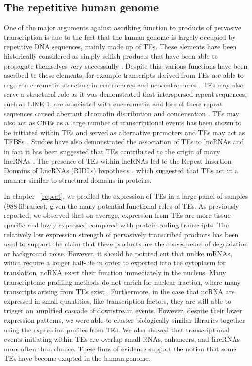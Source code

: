 \subsection{The repetitive human genome}

One of the major arguments against ascribing function to products of pervasive transcription is due to the fact that the human genome is largely occupied by repetitive DNA sequences, mainly made up of TEs. These elements have been historically considered as simply selfish products that have been able to propagate themselves very successfully \citep{doolittle1980selfish,orgel1980selfish}. Despite this, various functions have been ascribed to these elements; for example transcripts derived from TEs are able to regulate chromatin structure in centromeres and neocentromeres \citep{pmid19180186}. TEs may also serve a structural role as it was demonstrated that interspersed repeat sequences, such as LINE-1, are associated with euchromatin and loss of these repeat sequences caused aberrant chromatin distribution and condensation \citep{pmid24581492}. TEs may also act as CREs as a large number of transcriptional events has been shown to be initiated within TEs and served as alternative promoters \citep{pmid19377475} and TEs may act as TFBSs \citep{pmid18682548}. Studies have also demonstrated the association of TEs to lncRNAs \citep{pmid23181609, pmid23637635} and in fact it has been suggested that TEs contributed to the origin of many lncRNAs \citep{pmid25218058}. The presence of TEs within lncRNAs led to the Repeat Insertion Domains of LncRNAs (RIDLs) hypothesis \citep{pmid24850885}, which suggested that TEs act in a manner similar to structural domains in proteins.

In chapter ~\ref{repeat}, we profiled the expression of TEs in a large panel of samples (988 libraries), given the many potential functional roles of TEs. As previously reported, we observed that on average, expression from TEs are more tissue-specific and lowly expressed compared with protein-coding transcripts. The relatively low expression strength of pervasively transcribed products has been used to support the claim that these products are the consequence of degradation or background noise. However, it should be pointed out that unlike mRNAs, which require a longer half-life in order to exported into the cytoplasm for translation, ncRNA exert their function immediately in the nucleus. Many transcriptome profiling methods do not enrich for nuclear fraction, where many transcripts arising from TEs exist \citep{pmid24777452}. Furthermore, in the case that ncRNA are expressed in small quantities, like transcription factors, they are still able to trigger an amplified cascade of downstream events. However, despite their lower expression patterns, we were able to cluster biologically similar libraries together using the expression profiles from TEs. We also showed that transcriptional events initiating within TEs are overlap small RNAs, enhancers, and lincRNAs more often than chance. These lines of evidence support the notion that some TEs have become exapted in the human genome.
